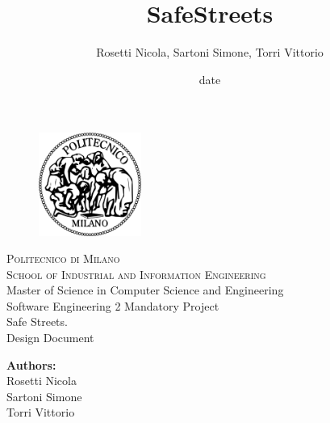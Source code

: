 \documentclass[a4paper]{report}
\begin{document}
\titleformat{\chapter}[hang] 
{\normalfont\huge\bfseries}{\thechapter}{1em}{} 

\title{SafeStreets}
\author{Rosetti Nicola, Sartoni Simone, Torri Vittorio}
\date{date} %

\begin{titlepage}
\begin{figure}[t]
\centering
\includegraphics[width=0.3\textwidth]{Logo}
\end{figure}
\begin{center}
    \textsc{ \LARGE{Politecnico di Milano \\}}
	\textsc{ \Large {School of Industrial and Information Engineering\\ }}
	\textnormal{ \Large{Master of Science in Computer Science and Engineering\\}}
	\vspace{3mm}
	\textnormal{ \Large{Software Engineering 2 Mandatory Project\\}}
	\vspace{30mm}
	\fontsize{10mm}{7mm}\selectfont 
    \textup{Safe Streets.}\\
    \textnormal{ \LARGE{Design Document\\}}
\end{center}

\vspace{18mm}

\begin{center}
    \textnormal{\large{\bf Authors:\\}}
	{\large Rosetti Nicola \\ Sartoni Simone \\ Torri Vittorio }
	\fontsize{10mm}{5mm}\selectfont 
\end{center}
\vspace{15mm}


\end{titlepage}
\end{document}
